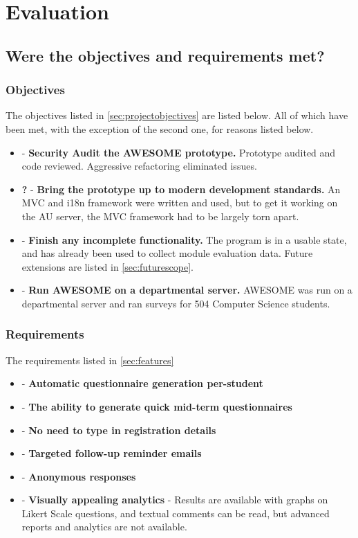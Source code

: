 \chapter{Evaluation}

	\section{Were the objectives and requirements met?}
	
	\subsection{Objectives}
	
	The objectives listed in \autoref{sec:projectobjectives} are listed below. All of which have been met, with the exception of the second one, for reasons listed below.
	
	\begin{itemize}
		\item \OK - \textbf{Security Audit the \ac{AWESOME} prototype.} Prototype audited and code reviewed. Aggressive refactoring eliminated issues.
		\item \textbf{?} - \textbf{Bring the prototype up to modern development standards.} An \ac{MVC} and \ac{i18n} framework were written and used, but to get it working on the \ac{AU} server, the \ac{MVC} framework had to be largely torn apart.
		\item \OK - \textbf{Finish any incomplete functionality.} The program is in a usable state, and has already been used to collect module evaluation data. Future extensions are listed in \autoref{sec:futurescope}.
		\item \OK - \textbf{Run \ac{AWESOME} on a departmental server.} \ac{AWESOME} was run on a departmental server and ran surveys for 504 Computer Science students.
	\end{itemize}
	
	\subsection{Requirements}
	
	The requirements listed in \autoref{sec:features}
	
	\begin{itemize}
		\item \OK - \textbf{Automatic questionnaire generation per-student}
		\item \OK - \textbf{The ability to generate quick mid-term questionnaires}
		\item \OK - \textbf{No need to type in registration details}
		\item \OK - \textbf{Targeted follow-up reminder emails}
		\item \OK - \textbf{Anonymous responses}
		\item \KO - \textbf{Visually appealing analytics} - Results are available with graphs on Likert Scale questions, and textual comments can be read, but advanced reports and analytics are not available.
	\end{itemize}
	
